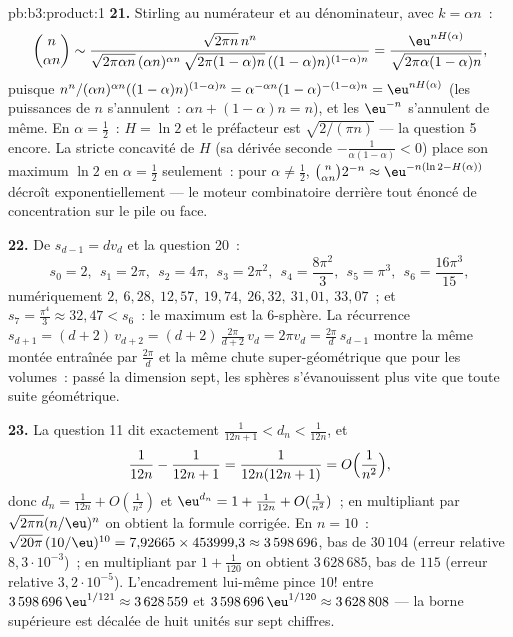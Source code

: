\begin{solution}{pb:b3:product:1}
\textbf{21.} Stirling au numérateur et au dénominateur, avec
$k = \alpha n$~:
\[
\binom n{\alpha n} \sim
\frac{\sqrt{2\pi n}\,n^n}
{\sqrt{2\pi\alpha n}\,(\alpha n)^{\alpha n}\,
\sqrt{2\pi(1-\alpha)n}\,((1-\alpha)n)^{(1-\alpha)n}}
= \frac{\eu^{nH(\alpha)}}{\sqrt{2\pi\alpha(1-\alpha)n}},
\]
puisque $n^n/(\alpha n)^{\alpha n}((1-\alpha)n)^{(1-\alpha)n}
= \alpha^{-\alpha n}(1-\alpha)^{-(1-\alpha)n} =
\eu^{nH(\alpha)}$ (les puissances de $n$ s'annulent~:
$\alpha n + (1-\alpha)n = n$), et les $\eu^{-n}$
s'annulent de même. En $\alpha = \frac12$~: $H = \ln2$ et
le préfacteur est $\sqrt{2/(\pi n)}$ --- la question 5
encore. La stricte concavité de $H$ (sa dérivée seconde
$-\frac1{\alpha(1-\alpha)} < 0$) place son maximum $\ln 2$
en $\alpha = \frac12$ seulement~: pour $\alpha \neq
\frac12$, $\binom n{\alpha n}2^{-n} \approx
\eu^{-n(\ln2 - H(\alpha))}$ décroît exponentiellement --- le
moteur combinatoire derrière tout énoncé de concentration
sur le pile ou face.

\textbf{22.} De $s_{d-1} = dv_d$ et la question 20~:
\[
s_0 = 2,\ \ s_1 = 2\pi,\ \ s_2 = 4\pi,\ \ s_3 = 2\pi^2,\ \
s_4 = \frac{8\pi^2}3,\ \ s_5 = \pi^3,\ \ s_6 =
\frac{16\pi^3}{15},
\]
numériquement $2,\ 6{,}28,\ 12{,}57,\ 19{,}74,\ 26{,}32,\
31{,}01,\ 33{,}07$~; et $s_7 = \frac{\pi^4}3 \approx 32{,}47
< s_6$~: le maximum est la $6$-sphère. La récurrence
$s_{d+1} = (d+2)\,v_{d+2} = (d+2)\,\frac{2\pi}{d+2}\,v_d =
2\pi v_d = \frac{2\pi}d\,s_{d-1}$ montre la même montée
entraînée par $\frac{2\pi}d$ et la même chute
super-géométrique que pour les volumes~: passé la dimension
sept, les sphères s'évanouissent plus vite que toute suite
géométrique.

\textbf{23.} La question 11 dit exactement $\frac1{12n+1} <
d_n < \frac1{12n}$, et
\[
\frac1{12n} - \frac1{12n+1} = \frac1{12n(12n+1)} =
O\Bigl(\frac1{n^2}\Bigr),
\]
donc $d_n = \frac1{12n} + O(\frac1{n^2})$ et $\eu^{d_n} = 1
+ \frac1{12n} + O(\frac1{n^2})$~; en multipliant par
$\sqrt{2\pi n}(n/\eu)^n$ on obtient la formule corrigée. En
$n = 10$~: $\sqrt{20\pi}\,(10/\eu)^{10} = 7{,}92665 \times
453999{,}3 \approx 3\,598\,696$, bas de $30\,104$ (erreur
relative $8{,}3\cdot10^{-3}$)~; en multipliant par $1 +
\frac1{120}$ on obtient $3\,628\,685$, bas de $115$ (erreur
relative $3{,}2\cdot10^{-5}$). L'encadrement lui-même pince
$10!$ entre $3\,598\,696\,\eu^{1/121} \approx 3\,628\,559$
et $3\,598\,696\,\eu^{1/120} \approx 3\,628\,808$ --- la
borne supérieure est décalée de huit unités sur sept
chiffres.


\end{solution}
